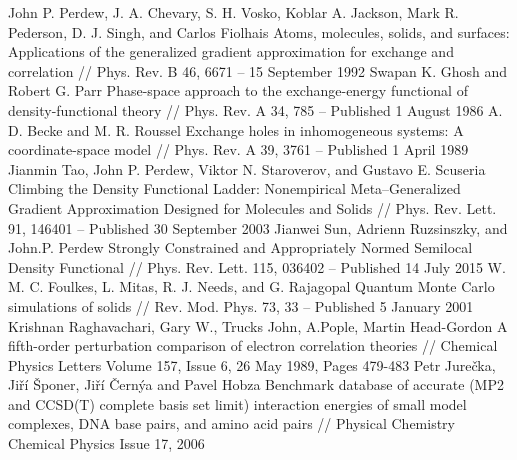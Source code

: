 \begin{thebibliography}{3}
John P. Perdew, J. A. Chevary, S. H. Vosko, Koblar A. Jackson, Mark R. Pederson, D. J. Singh, and Carlos Fiolhais Atoms, molecules, solids, and surfaces: Applications of the generalized gradient approximation for exchange and correlation
// Phys. Rev. B 46, 6671 – 15 September 1992
Swapan K. Ghosh and Robert G. Parr Phase-space approach to the exchange-energy functional of density-functional theory //
Phys. Rev. A 34, 785 – Published 1 August 1986
A. D. Becke and M. R. Roussel Exchange holes in inhomogeneous systems: A coordinate-space model //
Phys. Rev. A 39, 3761 – Published 1 April 1989
Jianmin Tao, John P. Perdew, Viktor N. Staroverov, and Gustavo E. Scuseria Climbing the Density Functional Ladder: Nonempirical Meta–Generalized Gradient Approximation Designed for Molecules and Solids //
Phys. Rev. Lett. 91, 146401 – Published 30 September 2003
Jianwei Sun, Adrienn Ruzsinszky, and John.P. Perdew Strongly Constrained and Appropriately Normed Semilocal Density Functional //
Phys. Rev. Lett. 115, 036402 – Published 14 July 2015
W. M. C. Foulkes, L. Mitas, R. J. Needs, and G. Rajagopal Quantum Monte Carlo simulations of solids //
Rev. Mod. Phys. 73, 33 – Published 5 January 2001
Krishnan Raghavachari, Gary W., Trucks John, A.Pople, Martin Head-Gordon A fifth-order perturbation comparison of electron correlation theories // Chemical Physics Letters
Volume 157, Issue 6, 26 May 1989, Pages 479-483
Petr Jurečka, Jiří Šponer, Jiří Černýa and Pavel Hobza Benchmark database of accurate (MP2 and CCSD(T) complete basis set limit) interaction energies of small model complexes, DNA base pairs, and amino acid pairs // Physical Chemistry Chemical Physics Issue 17, 2006




\end{thebibliography}
